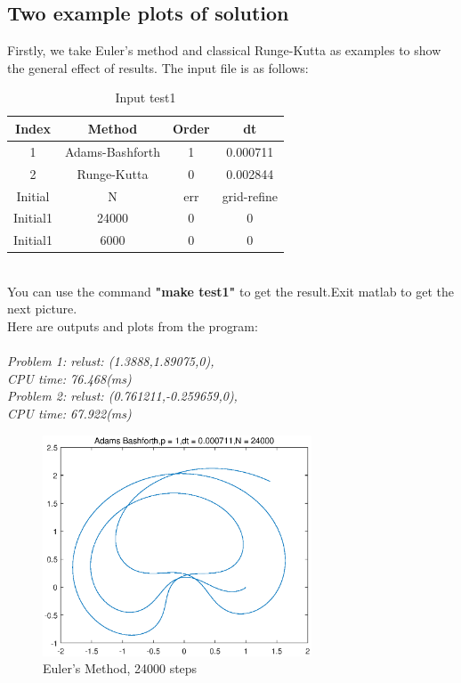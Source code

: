 \documentclass[a4paper,twocolumn]{article}
\theoremstyle{definition}
\begin{document}
\subsection{Two example plots of solution}
Firstly, we take Euler's method and classical Runge-Kutta as examples to show the general effect of results. The input file is as follows:\\
\begin{table}[!htp]
	\centering
	\begin{tabular}{|c|c|c|c|}
		\hline	
		Index & Method & Order & dt \\
		\hline		
		1 & Adams-Bashforth & 1 & 0.000711   \\	
		\hline		
		2 & Runge-Kutta & 0 & 0.002844   \\	
		\hline \hline
		Initial & N & err & grid-refine \\
		\hline
		Initial1 & 24000 & 0 & 0 \\
		\hline
		Initial1 & 6000 & 0 & 0 \\
		\hline
	\end{tabular}
	\caption{Input test1}
	\label{tab:test1}
\end{table}\\
You can use the command \textbf{"make test1"} to get the result.Exit matlab to get the next picture.\\
Here are outputs and plots from the program:\\\\
\emph{Problem 1: relust: (1.3888,1.89075,0),}\\
\emph{CPU time: 76.468(ms)}\\
\emph{Problem 2: relust: (0.761211,-0.259659,0),}\\
\emph{CPU time: 67.922(ms)}\\
\begin{figure}[!htp]   
	\centering
	\includegraphics[width=8cm]{Pictures/1_1.eps}
	\caption{Euler's Method, 24000 steps}
	\label{fig:Euler24000}
\end{figure}
\end{document}
